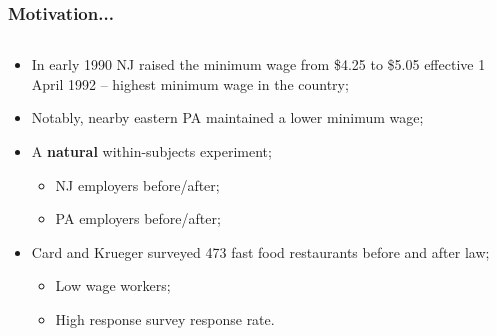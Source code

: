 \documentclass[aspectratio=169]{beamer}
\theoremstyle{principle}
\begin{document}
\begin{frame}
\frametitle{Motivation...}


\begin{columns}
\begin{column}{0.5\textwidth}

\begin{itemize}

\item In early 1990 NJ raised the minimum wage from \$4.25 to \$5.05 effective 1 April 1992 -- highest minimum wage in the country;
\bigskip

\item Notably, nearby eastern PA maintained a lower minimum wage;
\bigskip

\item A \textbf{natural} within-subjects experiment;
\begin{itemize}
\item NJ employers before/after;
\item PA employers before/after;
\end{itemize}
\bigskip

\item Card and Krueger surveyed 473 fast food restaurants before and after law;
\begin{itemize}
\item Low wage workers;
\item High response survey response rate.
\end{itemize}

\end{itemize}


\end{column}
\end{columns}
\end{frame}
\end{document}
